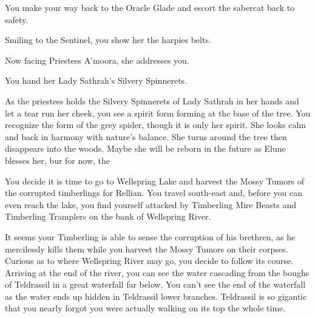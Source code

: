 
You make your way back to the Oracle Glade and escort the sabercat back to safety.





Smiling to the Sentinel, you show her the harpies belts.


Now facing Priestess A'moora, she addresses you.


You hand her Lady Sathrah's Silvery Spinnerets.


As the priestess holds the Silvery Spinnerets of Lady Sathrah in her hands and let a tear run her cheek, you see a spirit form forming at the base of the tree. You recognize the form of the grey spider, though it is only her spirit. She looks calm and back in harmony with nature's balance. She turns around the tree then disappears into the woods. Maybe she will be reborn in the future as Elune blesses her, bur for now, the 

You decide it is time to go to Wellspring Lake and harvest the Mossy Tumors of the corrupted timberlings for Rellian. You travel south-east and, before you can even reach the lake, you find yourself attacked by Timberling Mire Beasts and Timberling Tramplers on the bank of Wellspring River.

It seems your Timberling is able to sense the corruption of his brethren, as he mercilessly kills them while you harvest the Mossy Tumors on their corpses. Curious as to where Wellspring River may go, you decide to follow its course. Arriving at the end of the river, you can see the water cascading from the boughs of Teldrassil in a great waterfall far below. You can't see the end of the waterfall as the water ends up hidden in Teldrassil lower branches. Teldrassil is so gigantic that you nearly forgot you were actually walking on its top the whole time.

